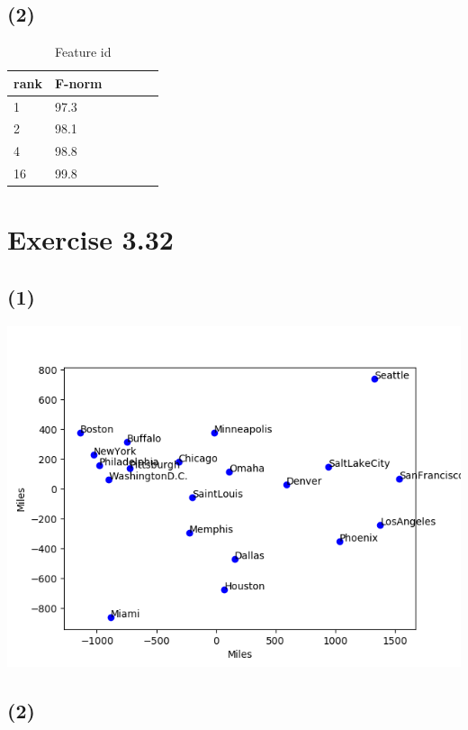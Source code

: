\documentclass[a4paper, 11pt]{article}
\begin{document}
\subsection*{(2)}

\begin{table}
\centering
\begin{tabular}{lllllp{}}
\toprule
rank & F-norm \\
\hline
1 & 97.3 \\
2 & 98.1  \\
4 & 98.8 \\
16 & 99.8 \\
\bottomrule
\end{tabular}
\caption{Feature id}
\label{tab:feature}
\end{table}










\section*{Exercise 3.32}

\subsection*{(1)}

\includegraphics{32.png}

\subsection*{(2)}
\end{document}
